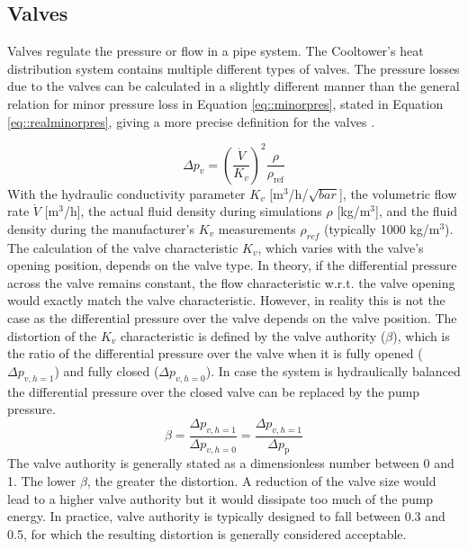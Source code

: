 


\subsection{Valves}\label{sec::valves}
Valves regulate the pressure or flow in a pipe system. The Cooltower's heat distribution system contains multiple different types of valves. The pressure losses due to the valves can be calculated in a slightly different manner than the general relation for minor pressure loss in Equation \ref{eq::minorpres}, stated in Equation \ref{eq::realminorpres}, giving a more precise definition for the valves \cite{Artikelphdchris}. 

\begin{equation}\label{eq::realminorpres}
    \Delta p_{v} = \left( \frac{\dot{V}}{K_v} \right)^{2} \frac{\rho}{\rho_{\text{ref}}}    
\end{equation}
With the hydraulic conductivity parameter $K_v$  [m$^3$/h/$\sqrt{bar}$], the volumetric flow rate $\dot{V}$ [m$^3$/h], the actual fluid density during simulations $\rho$ [kg/m$^3$], and the fluid density during the manufacturer's $K_v$ measurements $\rho_{ref}$ (typically 1000 kg/m$^3$). The calculation of the valve characteristic $K_v$, which varies with the valve's opening position, depends on the valve type. In theory, if the differential pressure across the valve remains constant, the flow characteristic w.r.t. the valve opening would exactly match the valve characteristic. However, in reality this is not the case as the differential pressure over the valve depends on the valve position. The distortion of the $K_v$ characteristic is defined by the valve authority ($\beta$), which is the ratio of the differential pressure over the valve when it is fully opened ($\Delta p_{v,h=1}$) and fully closed ($\Delta p_{v,h=0}$). In case the system is hydraulically balanced the differential pressure over the closed valve can be replaced by the pump pressure.  
\begin{equation}
    \beta = \frac{\Delta p_{v,h=1}}{\Delta p_{v,h=0}} = \frac{\Delta p_{v,h=1}}{\Delta p_{\text{p}}}
\end{equation}
The valve authority is generally stated as a dimensionless number between 0 and 1. The lower $\beta$, the greater the distortion. A reduction of the valve size would lead to a higher valve authority but it would dissipate too much of the pump energy. In practice, valve authority is typically designed to fall between 0.3 and 0.5, for which the resulting distortion is generally considered acceptable. 

